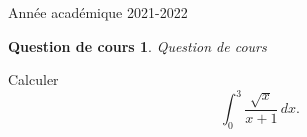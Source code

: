 \documentclass[a4paper, 11pt,openany]{book}%
\newtheorem[L]{thm}{Théorème}[section]
\newtheorem[M]{propo}[thm]{Proposition}
\newtheorem[M]{prop}[thm]{Propriété}
\newtheorem[M]{coro}[thm]{Corollaire}
\newtheorem[M]{lem}[thm]{Lemme}
\newtheorem[M,bodystyle=]{defi}[thm]{Définition}
\newtheorem[M,bodystyle=]{remark}[thm]{Remarque}
\newtheorem[M,bodystyle=]{met}[thm]{Méthode}
\newtheorem[M,bodystyle=]{ret}[thm]{A retenir}
\newtheorem[M,bodystyle=]{idee}[thm]{Idée}
\newtheorem[style=S,underline=false,bodystyle=]{exem}[thm]{Exemple}
\newtheorem[S,underline=false,bodystyle=]{exo}[thm]{Exercice}
\newtheorem[S,underline=false,bodystyle=]{appli}[thm]{Application}
\newtheorem[S,underline=false,bodystyle=]{sol}[thm]{Solution}
\newtheorem[S,underline=false,bodystyle=]{hypo}[thm]{Hypothesis}
\newtheorem[S,underline=false,bodystyle=]{nota}[thm]{Notation}
\newtheorem{cours}{Question de cours}
\begin{document}
\begin{titlepage}
\begin{sffamily}
\begin{center}

    \vfill

    {\large Année académique 2021-2022}

  \end{center}
  \end{sffamily}
\end{titlepage}
\begin{cours}
Question de cours\end{cours}



\begin{exo}

Calculer
\[ \int_0^3 \frac{\sqrt{x}}{x +1} \, dx.\]

\end{exo}


\begin{sol}

%
\end{sol}
\end{document}
